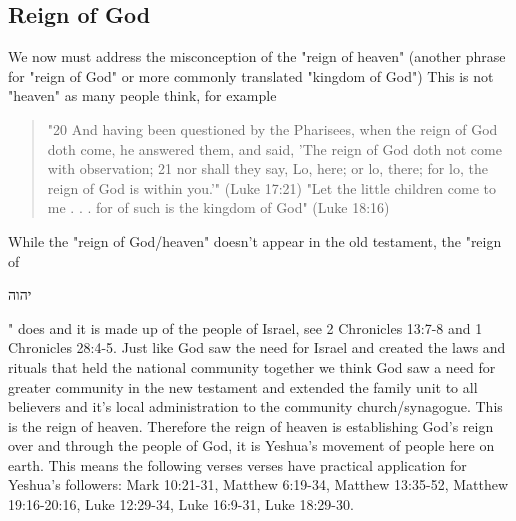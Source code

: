 \documentclass[11pt]{article}
\begin{document}
\subsection{Reign of God} 
We now must address the misconception of the "reign of heaven" (another phrase for "reign of God" or more commonly translated "kingdom of God") This is not "heaven" as many people think, for example 
\begin{quote}
 "20 And having been questioned by the Pharisees, when the reign of God doth come, he answered them, and said, 'The reign of God doth not come with observation; 21 nor shall they say, Lo, here; or lo, there; for lo, the reign of God is within you.'" (Luke 17:21) "Let the little children come to me . . . for of such is the kingdom of God" (Luke 18:16) 
\end{quote}
While the "reign of God/heaven" doesn't appear in the old testament, the "reign of\begin{hebrew} יהוה\end{hebrew}" does and it is made up of the people of Israel, see 2 Chronicles 13:7-8 and 1 Chronicles 28:4-5. Just like God saw the need for Israel and created the laws and rituals that held the national community together we think God saw a need for greater community in the new testament and extended the family unit to all believers and it's local administration to the community church/synagogue. This is the reign of heaven. Therefore the reign of heaven is establishing God's reign over and through the people of God, it is Yeshua's movement of people here on earth. \cite{kh} This means the following verses verses have practical application for Yeshua's followers:  Mark 10:21-31, Matthew 6:19-34, Matthew 13:35-52, Matthew 19:16-20:16, Luke 12:29-34, Luke 16:9-31, Luke 18:29-30. 
\end{document}
